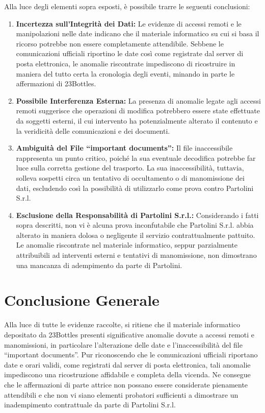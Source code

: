 Alla luce degli elementi sopra esposti, è possibile trarre le seguenti conclusioni:

\begin{enumerate}
    \item \textbf{Incertezza sull'Integrità dei Dati:} Le evidenze di accessi remoti e le manipolazioni nelle date indicano che il materiale informatico su cui si basa il ricorso potrebbe non essere completamente attendibile. Sebbene le comunicazioni ufficiali riportino le date così come registrate dal server di posta elettronica, le anomalie riscontrate impediscono di ricostruire in maniera del tutto certa la cronologia degli eventi, minando in parte le affermazioni di 23Bottles.
    
    \item \textbf{Possibile Interferenza Esterna:} La presenza di anomalie legate agli accessi remoti suggerisce che operazioni di modifica potrebbero essere state effettuate da soggetti esterni, il cui intervento ha potenzialmente alterato il contenuto e la veridicità delle comunicazioni e dei documenti.
    
    \item \textbf{Ambiguità del File ``important documents'':} Il file inaccessibile rappresenta un punto critico, poiché la sua eventuale decodifica potrebbe far luce sulla corretta gestione del trasporto. La sua inaccessibilità, tuttavia, solleva sospetti circa un tentativo di occultamento o di manomissione dei dati, escludendo così la possibilità di utilizzarlo come prova contro Partolini S.r.l.
    
    \item \textbf{Esclusione della Responsabilità di Partolini S.r.l.:} Considerando i fatti sopra descritti, non vi è alcuna prova inconfutabile che Partolini S.r.l. abbia alterato in maniera dolosa o negligente il servizio contrattualmente pattuito. Le anomalie riscontrate nel materiale informatico, seppur parzialmente attribuibili ad interventi esterni e tentativi di manomissione, non dimostrano una mancanza di adempimento da parte di Partolini.
\end{enumerate}

\section*{Conclusione Generale}
Alla luce di tutte le evidenze raccolte, si ritiene che il materiale informatico depositato da 23Bottles presenti significative anomalie dovute a accessi remoti e manomissioni, in particolare l'alterazione delle date e l'inaccessibilità del file ``important documents''. Pur riconoscendo che le comunicazioni ufficiali riportano date e orari validi, come registrati dal server di posta elettronica, tali anomalie impediscono una ricostruzione affidabile e completa della vicenda. Ne consegue che le affermazioni di parte attrice non possano essere considerate pienamente attendibili e che non vi siano elementi probatori sufficienti a dimostrare un inadempimento contrattuale da parte di Partolini S.r.l.

